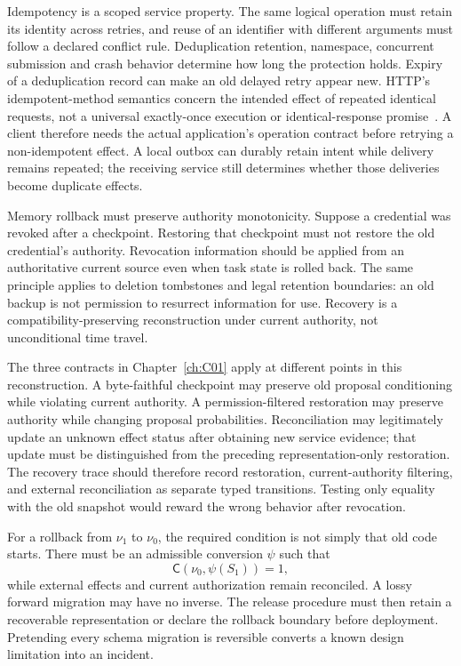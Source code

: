 Idempotency is a scoped service property. The same logical operation must retain its identity across retries, and reuse of an identifier with different arguments must follow a declared conflict rule. Deduplication retention, namespace, concurrent submission and crash behavior determine how long the protection holds. Expiry of a deduplication record can make an old delayed retry appear new. HTTP's idempotent-method semantics concern the intended effect of repeated identical requests, not a universal exactly-once execution or identical-response promise~\cite{cumulative_c_http9110}. A client therefore needs the actual application's operation contract before retrying a non-idempotent effect. A local outbox can durably retain intent while delivery remains repeated; the receiving service still determines whether those deliveries become duplicate effects.

Memory rollback must preserve authority monotonicity. Suppose a credential was revoked after a checkpoint. Restoring that checkpoint must not restore the old credential's authority. Revocation information should be applied from an authoritative current source even when task state is rolled back. The same principle applies to deletion tombstones and legal retention boundaries: an old backup is not permission to resurrect information for use. Recovery is a compatibility-preserving reconstruction under current authority, not unconditional time travel.

The three contracts in Chapter~\ref{ch:C01} apply at different points in this reconstruction. A byte-faithful checkpoint may preserve old proposal conditioning while violating current authority. A permission-filtered restoration may preserve authority while changing proposal probabilities. Reconciliation may legitimately update an unknown effect status after obtaining new service evidence; that update must be distinguished from the preceding representation-only restoration. The recovery trace should therefore record restoration, current-authority filtering, and external reconciliation as separate typed transitions. Testing only equality with the old snapshot would reward the wrong behavior after revocation.

For a rollback from $\nu_1$ to $\nu_0$, the required condition is not simply that old code starts. There must be an admissible conversion $\psi$ such that
\begin{equation}
 \mathsf C(\nu_0,\psi(S_1))=1,
\end{equation}
while external effects and current authorization remain reconciled. A lossy forward migration may have no inverse. The release procedure must then retain a recoverable representation or declare the rollback boundary before deployment. Pretending every schema migration is reversible converts a known design limitation into an incident.



